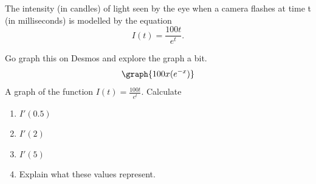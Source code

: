 \documentclass{ximera}
\begin{document}
\begin{exercise}
    The intensity (in candles) of light seen by the eye when a camera flashes at time t (in milliseconds) is modelled by the equation
        $$I(t)=\frac{100t}{e^t}.$$
      
    Go graph this on Desmos and explore the graph a bit.
    \[
        \graph{100x(e^{-x})}
    \]
    \xmalt A graph of the function $I(t)=\frac{100t}{e^t}$.
    Calculate 
    \begin{enumerate}
        \item[a.] $I'(0.5)$ 

        \item[b.] $I'(2)$

        \item[c.] $I'(5)$

        \item[d.] Explain what these values represent. 

\end{enumerate}

\end{exercise}
\end{document}
